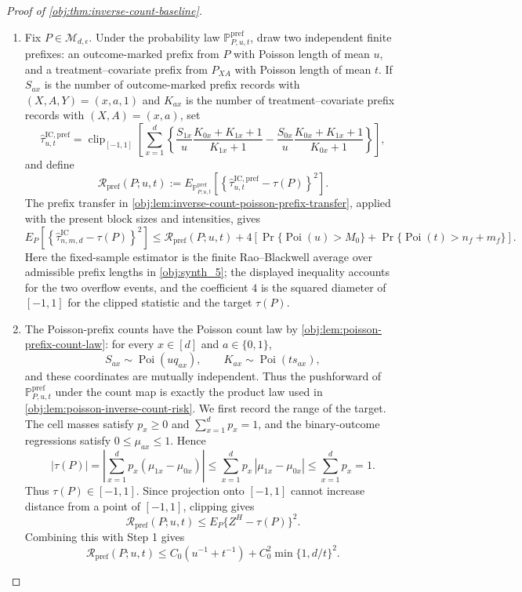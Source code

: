 \begin{proof}[Proof of \cref{obj:thm:inverse-count-baseline}]
\begin{enumerate}
\item Fix \(P\in\mathcal M_{d,\epsilon}\).  Under the probability law \(\mathbb P^{\mathrm{pref}}_{P,u,t}\), draw two independent finite prefixes: an outcome-marked prefix from \(P\) with Poisson length of mean \(u\), and a treatment--covariate prefix from \(P_{XA}\) with Poisson length of mean \(t\).  If \(S_{ax}\) is the number of outcome-marked prefix records with \((X,A,Y)=(x,a,1)\) and \(K_{ax}\) is the number of treatment--covariate prefix records with \((X,A)=(x,a)\), set
\[
\widehat\tau^{\mathrm{IC,pref}}_{u,t}
=
\operatorname{clip}_{[-1,1]}
\left[
\sum_{x=1}^d
\left\{
\frac{S_{1x}}u\frac{K_{0x}+K_{1x}+1}{K_{1x}+1}
-
\frac{S_{0x}}u\frac{K_{0x}+K_{1x}+1}{K_{0x}+1}
\right\}
\right],
\]
and define
\[
\mathcal R_{\mathrm{pref}}(P;u,t)
:=
E_{\mathbb P^{\mathrm{pref}}_{P,u,t}}
\left[
\left\{
\widehat\tau^{\mathrm{IC,pref}}_{u,t}-\tau(P)
\right\}^2
\right].
\]
The prefix transfer in \cref{obj:lem:inverse-count-poisson-prefix-transfer}, applied with the present block sizes and intensities, gives
\[
E_P\!\left[
\left\{\widehat\tau^{\mathrm{IC}}_{n,m,d}-\tau(P)\right\}^2
\right]
\le
\mathcal R_{\mathrm{pref}}(P;u,t)
+
4\left[
\Pr\{\operatorname{Poi}(u)>M_0\}
+
\Pr\{\operatorname{Poi}(t)>n_f+m_f\}
\right].
\]
Here the fixed-sample estimator is the finite Rao--Blackwell average over admissible prefix lengths in \cref{obj:synth_5}; the displayed inequality accounts for the two overflow events, and the coefficient \(4\) is the squared diameter of \([-1,1]\) for the clipped statistic and the target \(\tau(P)\). %

\item The Poisson-prefix counts have the Poisson count law by \cref{obj:lem:poisson-prefix-count-law}: for every \(x\in[d]\) and \(a\in\{0,1\}\),
\[
S_{ax}\sim\operatorname{Poi}(u q_{ax}),
\qquad
K_{ax}\sim\operatorname{Poi}(t s_{ax}),
\]
and these coordinates are mutually independent.  Thus the pushforward of \(\mathbb P^{\mathrm{pref}}_{P,u,t}\) under the count map is exactly the product law used in \cref{obj:lem:poisson-inverse-count-risk}.  We first record the range of the target.  The cell masses satisfy \(p_x\ge0\) and \(\sum_{x=1}^d p_x=1\), and the binary-outcome regressions satisfy \(0\le\mu_{ax}\le1\).  Hence
\[
\left|\tau(P)\right|
=
\left|\sum_{x=1}^d p_x(\mu_{1x}-\mu_{0x})\right|
\le
\sum_{x=1}^d p_x\,|\mu_{1x}-\mu_{0x}|
\le
\sum_{x=1}^d p_x
=1 .
\]
Thus \(\tau(P)\in[-1,1]\).  Since projection onto \([-1,1]\) cannot increase distance from a point of \([-1,1]\), clipping gives
\[
\mathcal R_{\mathrm{pref}}(P;u,t)
\le
E_P\{Z^H-\tau(P)\}^2 .
\]
Combining this with Step 1 gives
\[
\mathcal R_{\mathrm{pref}}(P;u,t)
\le
C_0(u^{-1}+t^{-1})
+
C_0^2\min\{1,d/t\}^2 .
\]


\end{enumerate}
\end{proof}
